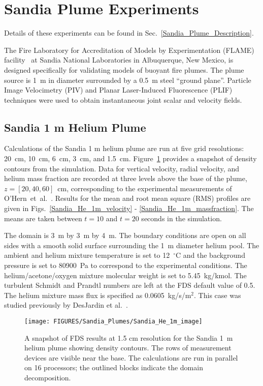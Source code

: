 \clearpage

\section{Sandia Plume Experiments}

Details of these experiments can be found in Sec.~\ref{Sandia_Plume_Description}.

The Fire Laboratory for Accreditation of Models by Experimentation (FLAME) facility~\cite{OHern:2005,Blanchat:2001} at Sandia National Laboratories in Albuquerque, New Mexico, is designed specifically for validating models of buoyant fire plumes.  The plume source is 1~m in diameter surrounded by a 0.5~m steel ``ground plane''. Particle Image Velocimetry (PIV) and Planar Laser-Induced Fluorescence (PLIF) techniques were used to obtain instantaneous joint scalar and velocity fields.

\subsection{Sandia 1 m Helium Plume}
\label{Sandia plume}

Calculations of the Sandia 1 m helium plume are run at five grid resolutions: 20~cm, 10~cm, 6~cm, 3~cm, and 1.5~cm. Figure~\ref{Sandia_He_1m_image} provides a snapshot of density contours from the simulation. Data for vertical velocity, radial velocity, and helium mass fraction are recorded at three levels above the base of the plume, $z = [20, 40, 60]$~cm, corresponding to the experimental measurements of O'Hern~et~al.~\cite{OHern:2005}.  Results for the mean and root mean square (RMS) profiles are given in Figs.~\ref{Sandia_He_1m_velocity} - \ref{Sandia_He_1m_massfraction}.  The means are taken between $t=10$ and $t=20$ seconds in the simulation.

The domain is 3~m by 3~m by 4~m. The boundary conditions are open on all sides with a smooth solid surface surrounding the 1~m diameter helium pool.  The ambient and helium mixture temperature is set to 12~$^\circ$C and the background pressure is set to 80900~Pa to correspond to the experimental conditions.  The helium/acetone/oxygen mixture molecular weight is set to 5.45~kg/kmol.  The turbulent Schmidt and Prandtl numbers are left at the FDS default value of 0.5.  The helium mixture mass flux is specified as 0.0605~kg/s/m$^2$. This case was studied previously by DesJardin et al.~\cite{DesJardin:2004}.
\begin{figure}[h]
\centering
\texttt{[image: FIGURES/Sandia\_Plumes/Sandia\_He\_1m\_image]}
\caption[Sandia 1~m helium plume image]{A snapshot of FDS results at 1.5 cm resolution for the Sandia 1~m helium plume showing density contours.  The rows of measurement devices are visible near the base. The calculations are run in parallel on 16 processors; the outlined blocks indicate the domain decomposition.}
\label{Sandia_He_1m_image}
\end{figure}

